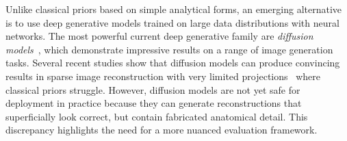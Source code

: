 Unlike classical priors based on simple analytical forms, an emerging alternative is to use deep generative models trained on large data distributions with neural networks. The most powerful current deep generative family are \emph{diffusion models}~\cite{dhariwal2021diffusion}, which demonstrate impressive results on a range of image generation tasks. Several recent studies show that diffusion models can produce convincing results in sparse image reconstruction with very limited projections~\cite{sun2024difr3ct} where classical priors struggle. However, diffusion models are not yet safe for deployment in practice because they can generate reconstructions that superficially look correct, but contain fabricated anatomical detail. This discrepancy highlights the need for a more nuanced evaluation framework. %

